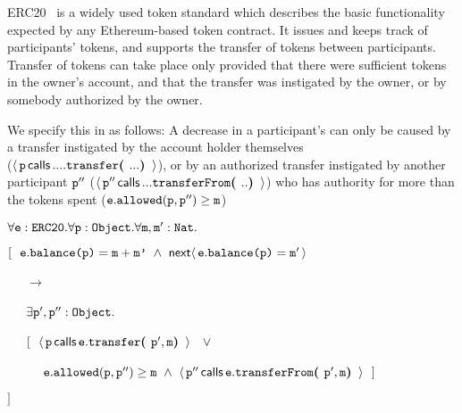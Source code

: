  
 ERC20~\cite{ERC20} is a widely used token standard which describes the 
 basic functionality expected by any    Ethereum-based token contract. 
 It issues and keeps track of participants' tokens, and supports the  transfer
 of tokens between participants. 
%
%
Transfer of tokens 
 can   take place only provided that  there were sufficient tokens in the
 owner's account, and that
 the transfer was instigated by the owner, or by somebody authorized
 by the owner.

We specify this in \Chainmail as follows:
A decrease in  a participant's  
can only be caused by a transfer instigated by the 
account holder themselves\\ (\ie $\Calls {\prg{p}} {\prg{transfer}} {...} {...}$), or by
an authorized transfer instigated by another participant $\prg{p}''$  (\ie $\Calls {\prg{p}''} {{\prg{transferFrom}} } {..} {..}$) who 
has authority for more than the tokens spent (\ie  $\prg{e}.\prg{allowed}(\prg{p},\prg{p}'')\geq \prg{m}$)
 
\vspace{.15cm}
\noindent
$\forall \prg{e}:\prg{ERC20}.\forall \prg{p}:\prg{Object}.\forall \prg{m},\prg{m}':\prg{Nat}.$\\
\strut \hspace{0.3cm} $[\ \ \prg{e}.\prg{balance(p)}=\prg{m}+\prg{m'}\ \wedge \ \Next{\prg{e}.\prg{balance(p)}=\prg{m}'}$ \\ %
\strut \hspace{0.4cm} \ \ \ $\longrightarrow$\\
\strut \hspace{0.4cm} \ \ \ $\exists \prg{p}',\prg{p}'':\prg{Object}.$ \\
\strut \hspace{0.4cm} \ \ \  $[\ \  \Calls{\prg{p}} {\prg{transfer}}  {\prg{e}}  {\prg{p}',\prg{m}} \  \  \ \vee\, $\\
\strut \hspace{0.4cm} \ \ \   $\ \ \ \ \prg{e}.\prg{allowed}(\prg{p},\prg{p}'')\geq \prg{m} \ \wedge \ \Calls{\prg{p}''} {\prg{transferFrom}}  {\prg{e}}  {\prg{p}',\prg{m}}\       \  ]$\\
\strut \hspace{0.3cm} $] $
\vspace{.15cm}


